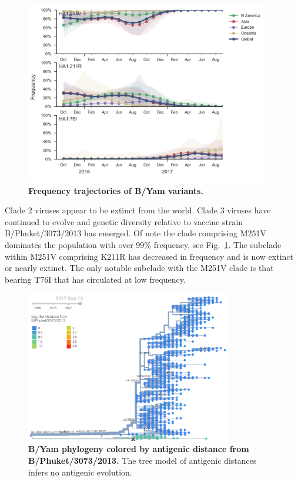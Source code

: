 \documentclass[11pt,oneside,letterpaper]{article}
\newcommand{\FIG}[1]{Fig.~\ref{#1}}
\begin{document}
\clearpage
\begin{figure}[H]
  \centering
  \includegraphics[width=0.95\textwidth]{../figures/sep-2017/yam_mutations.png}
  \caption{\textbf{Frequency trajectories of B/Yam variants.}
  }
  \label{Yam_mutations}
\end{figure}
Clade 2 viruses appear to be extinct from the world. Clade 3 viruses
have continued to evolve and genetic diversity relative to vaccine
strain B/Phuket/3073/2013 has emerged. Of note the clade comprising
M251V dominates the population with over 99\% frequency, see \FIG{Yam_mutations}. The subclade
within M251V comprising K211R has decreased in frequency and is now
extinct or nearly extinct. The only notable subclade with the M251V
clade is that bearing T76I that has circulated at low frequency.


\begin{figure}[H]
  \centering
  \includegraphics[width=0.8\textwidth]{../figures/sep-2017/yam_tree_titer_model.png}
  \caption{\textbf{B/Yam phylogeny colored by antigenic distance from B/Phuket/3073/2013.} The tree model of antigenic distances infers no antigenic evolution.
  }
  \label{Yam_tree}
\end{figure}
\end{document}
